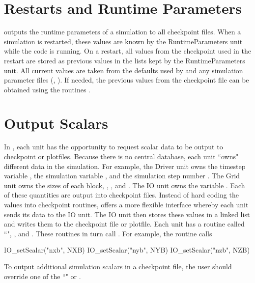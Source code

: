 \section{Restarts and Runtime Parameters}\label{Sec:runtime parameters}

\flashx outputs the runtime parameters of a simulation to all checkpoint files.
When a simulation is restarted, these values are known by the \unit{RuntimeParameters} unit while
the code is running.  On a restart, all values from the checkpoint used in the
restart are stored as previous values in the lists kept by the
\unit{RuntimeParameters} unit.  All current values are taken from the
defaults used by \flashx and any simulation parameter files (\eg, ).  If needed, the previous
values from the checkpoint file can be obtained using the routines 
.

\section{Output Scalars}\label{Sec:output scalars}

In \flashx, each unit has the opportunity to request scalar data to be
output to checkpoint or plotfiles.  Because there is no central
database, each unit ``owns" different data in the
simulation. For example, the \unit{Driver} unit owns the timestep variable
, the simulation variable , and the simulation
step number .  The \unit{Grid} unit owns the sizes of each
block, , , and .  The \unit{IO} unit owns
the variable .  Each of these
quantities are output into checkpoint files. Instead of hard coding the values into
checkpoint routines, \flashx offers a more flexible interface whereby
each unit sends its data to the \unit{IO} unit.  The \unit{IO} unit then stores
these values in a linked list and writes them to the checkpoint file or
plotfile.  Each unit has a routine called ``", \eg,
 and
. These routines in turn call
.  For example, the routine
 calls

\begin{codeseg}
 IO_setScalar("nxb", NXB)
 IO_setScalar("nyb", NYB)
 IO_setScalar("nzb", NZB)
\end{codeseg}

To output additional simulation scalars in a checkpoint file, the user should 
override one of the ``" or 
.

